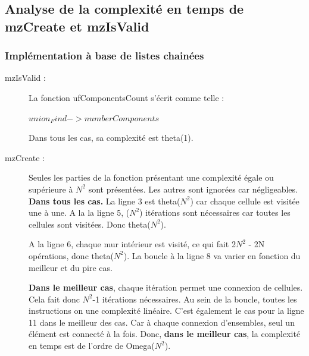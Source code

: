 \documentclass[11pt]{article}
\begin{document}
\subsection{Analyse de la complexité en temps de mzCreate et mzIsValid}

\subsubsection{Implémentation à base de listes chainées}
\begin{description}
\item[mzIsValid :]La fonction ufComponentsCount s'écrit comme telle :
\begin{codebox}
\li \Return $union_Find->numberComponents$
\end{codebox}
Dans tous les cas, sa complexité est theta(1).



\item[mzCreate :] Seules les parties de la fonction présentant une complexité égale ou supérieure à $N^{2}$ sont présentées. Les autres sont ignorées car négligeables. \textbf{Dans tous les cas.} La ligne 3 est theta($N^{2}$) car chaque cellule est visitée une à une. A la la ligne 5, ($N^{2}$) itérations sont nécessaires car toutes les cellules sont visitées. Donc theta($N^{2}$).

A la ligne 6, chaque mur intérieur est visité, ce qui fait 2$N^{2}$ - 2N opérations, donc theta($N^{2}$).
La boucle à la ligne 8 va varier en fonction du meilleur et du pire cas. 

\textbf{Dans le meilleur cas}, chaque itération permet une connexion de cellules. Cela fait donc $N^{2}$-1 itérations nécessaires. Au sein de la boucle, toutes les instructions on une complexité linéaire. C'est également le cas pour la ligne 11 dans le meilleur des cas. Car à chaque connexion d'ensembles, seul un élément est connecté à la fois. Donc,\textbf{ dans le meilleur cas}, la complexité en temps est de l'ordre de Omega($N^{2}$). 


\end{description}
\end{document}
